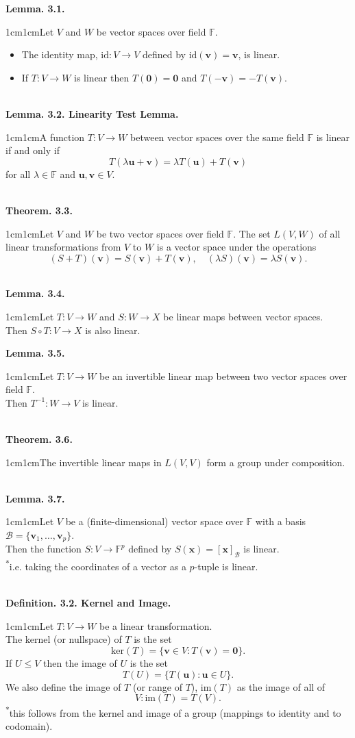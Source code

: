 \documentclass{article}
\newcommand{\vect}[1]{\mathbf{#1}}
\newcommand{\definition}[2]{\textbf{Definition. #1.}\begin{adjustwidth}{1cm}{1cm}#2\end{adjustwidth}}
\newcommand{\theorem}[2]{\textbf{Theorem. #1.}\begin{adjustwidth}{1cm}{1cm}#2\end{adjustwidth}}
\newcommand{\lemma}[2]{\textbf{Lemma. #1.}\begin{adjustwidth}{1cm}{1cm}#2\end{adjustwidth}}
\begin{document}
\lemma{3.1}{Let $V$ and $W$ be vector spaces over field $\mathbb{F}$.\begin{itemize}\item The identity map, $\text{id} : V \rightarrow V$ defined by $\text{id}(\vect{v}) = \vect{v}$, is linear. \item If $T:V \rightarrow W$ is linear then $T(\vect{0}) = \vect{0}$ and $T(-\vect{v}) = -T(\vect{v})$.\end{itemize}}~\\
\lemma{3.2. Linearity Test Lemma}{A function $T: V \rightarrow W$ between vector spaces over the same field $\mathbb{F}$ is linear if and only if \[T(\lambda \vect{u} + \vect{v}) = \lambda T(\vect{u}) + T (\vect{v})\] for all $\lambda \in \mathbb{F}$ and $\vect{u}, \vect{v} \in V$.}~\\
\theorem{3.3}{Let $V$ and $W$ be two vector spaces over field $\mathbb{F}$. The set $L(V,W)$ of all linear transformations from $V$ to $W$ is a vector space under the operations \[(S+T)(\vect{v}) = S(\vect{v}) + T(\vect{v}), \quad (\lambda S)(\vect{v}) = \lambda S(\vect{v}).\]}~\\
\lemma{3.4}{Let $T : V \rightarrow W$ and $S : W \rightarrow X$ be linear maps between vector spaces.\\Then $S \circ T: V \rightarrow X$ is also linear.}\newpage
\lemma{3.5}{Let $T : V \rightarrow W$ be an invertible linear map between two vector spaces over field $\mathbb{F}$.\\Then $T^{-1} : W \rightarrow V$ is linear.}~\\
\theorem{3.6}{The invertible linear maps in $L(V,V)$ form a group under composition.}~\\
\lemma{3.7}{Let $V$ be a (finite-dimensional) vector space over $\mathbb{F}$ with a basis $\mathcal{B} = \{ \vect{v}_1 , \ldots , \vect{v}_p \}$.\\Then the function $S : V \rightarrow \mathbb{F}^p$ defined by $S(\vect{x}) = [\vect{x}]_\mathcal{B}$ is linear.\\[1\baselineskip]\textsuperscript{*}i.e. taking the coordinates of a vector as a $p$-tuple is linear.}~\\
\definition{3.2. Kernel and Image}{Let $T : V \rightarrow W$ be a linear transformation.\\The kernel (or nullspace) of $T$ is the set \[\text{ker}(T) = \{ \vect{v} \in V: T(\vect{v}) = \vect{0} \}. \]If $U \leq V$ then the image of $U$ is the set \[T(U) = \{ T(\vect{u}) : \vect{u} \in U \}. \]We also define the image of $T$ (or range of $T$), $\text{im}(T)$ as the image of all of \[V: \text{im}(T) = T(V).\]\textsuperscript{*}this follows from the kernel and image of a group (mappings to identity and to codomain).}~\\
\end{document}
